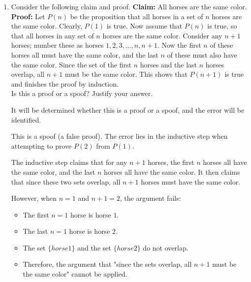 \begin{enumerate}
\begin{enumerate}
\begin{subprove}
      By , it follows that \(P(n)\) is true for all integers \(n \geq 2\).
      
      Therefore, the inequality \(n! < n^{n}\) holds for all integers \(n \geq 2\).
    \end{subprove}
  \end{enumerate}
  \item Consider the following claim and proof.
  \textbf{Claim:} All horses are the same color.
  \textbf{Proof:} Let \(P(n)\) be the proposition that all horses in a set of \(n\) horses are the same color.
  Clearly, \(P(1)\) is true.
  Now assume that \(P(n)\) is true, so that all horses in any set of \(n\) horses are the same color.
  Consider any \(n+1\) horses; number these as horses \(1, 2, 3, \ldots, n, n+1\).
  Now the first \(n\) of these horses all must have the same color, and the last \(n\) of these must also have the same color.
  Since the set of the first \(n\) horses and the last \(n\) horses overlap, all \(n+1\) must be the same color.
  This shows that \(P(n+1)\) is true and finishes the proof by induction.\\  
  Is this a proof or a spoof? Justify your answer.
  \begin{subprove}
    It will be determined whether this is a proof or a spoof, and the error will be identified.
    
    This is a spoof (a false proof).
    The error lies in the inductive step when attempting to prove \(P(2)\) from \(P(1)\).
    
    The inductive step claims that for any \(n+1\) horses, the first \(n\) horses all have the same color, and the last \(n\) horses all have the same color.
    It then claims that since these two sets overlap, all \(n+1\) horses must have the same color.
    
    However, when \(n = 1\) and \(n+1 = 2\), the argument fails:
    \begin{itemize}
      \item The first \(n = 1\) horse is horse \(1\).
      \item The last \(n = 1\) horse is horse \(2\).
      \item The set \(\{horse 1\}\) and the set \(\{horse 2\}\) do not overlap.
      \item Therefore, the argument that "since the sets overlap, all \(n+1\) must be the same color" cannot be applied.
    \end{itemize}
    

\end{subprove}
\end{enumerate}
